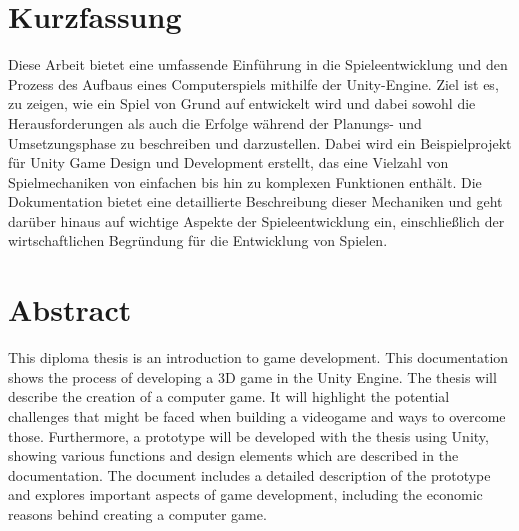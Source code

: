 \chapter{Kurzfassung}

Diese Arbeit bietet eine umfassende Einführung in die Spieleentwicklung und den Prozess des Aufbaus eines Computerspiels mithilfe der Unity-Engine. Ziel ist es, zu zeigen, wie ein Spiel von Grund auf entwickelt wird und dabei sowohl die Herausforderungen als auch die Erfolge während der Planungs- und Umsetzungsphase zu beschreiben und darzustellen. Dabei wird ein Beispielprojekt für Unity Game Design und Development erstellt, das eine Vielzahl von Spielmechaniken von einfachen bis hin zu komplexen Funktionen enthält. Die Dokumentation bietet eine detaillierte Beschreibung dieser Mechaniken und geht darüber hinaus auf wichtige Aspekte der Spieleentwicklung ein, einschließlich der wirtschaftlichen Begründung für die Entwicklung von Spielen.

\chapter{Abstract}

This diploma thesis is an introduction to game development. This documentation shows the process of developing a 3D game in the Unity Engine. The thesis will describe the creation of a computer game. It will highlight the potential challenges that might be faced when building a videogame and ways to overcome those. Furthermore, a prototype will be developed with the thesis using Unity, showing various functions and design elements which are described in the documentation. The document includes a detailed description of the prototype and explores important aspects of game development, including the economic reasons behind creating a computer game.
